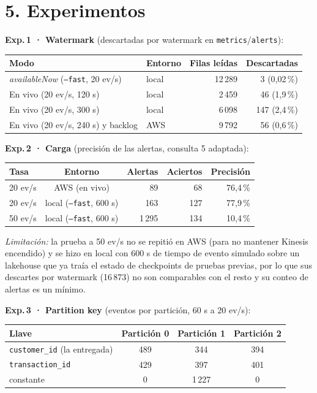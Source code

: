 \documentclass[10pt,a4paper]{article}
\newcommand{\code}[1]{\texttt{\small #1}}
\begin{document}
\section*{5. Experimentos}
\textbf{Exp.\,1 · Watermark} (descartadas por watermark en \code{metrics}/\code{alerts}):
\begin{center}\small\begin{tabular}{@{}llrr@{}}\toprule
\textbf{Modo} & \textbf{Entorno} & \textbf{Filas leídas} & \textbf{Descartadas}\\\midrule
\emph{availableNow} (\code{--fast}, 20 ev/s) & local & 12\,289 & 3 (0,02\,\%)\\
En vivo (20 ev/s, 120 s) & local & 2\,459 & 46 (1,9\,\%)\\
En vivo (20 ev/s, 300 s) & local & 6\,098 & 147 (2,4\,\%)\\
En vivo (20 ev/s, 240 s) y backlog & AWS & 9\,792 & 56 (0,6\,\%)\\\bottomrule
\end{tabular}\end{center}
\textbf{Exp.\,2 · Carga} (precisión de las alertas, consulta 5 adaptada):
\begin{center}\small\begin{tabular}{@{}lcrrr@{}}\toprule
\textbf{Tasa} & \textbf{Entorno} & \textbf{Alertas} & \textbf{Aciertos} & \textbf{Precisión}\\\midrule
20 ev/s & AWS (en vivo) & 89 & 68 & 76,4\,\%\\
20 ev/s & local (\code{--fast}, 600 s) & 163 & 127 & 77,9\,\%\\
50 ev/s & local (\code{--fast}, 600 s) & 1\,295 & 134 & 10,4\,\%\\\bottomrule
\end{tabular}\end{center}
\emph{Limitación:} la prueba a 50 ev/s no se repitió en AWS (para no mantener Kinesis encendido) y se hizo en local con 600 s de tiempo de evento simulado sobre un lakehouse que ya traía el estado de checkpoints de pruebas previas, por lo que sus descartes por watermark (16\,873) no son comparables con el resto y su conteo de alertas es un mínimo.

\textbf{Exp.\,3 · Partition key} (eventos por partición, 60 s a 20 ev/s):
\begin{center}\small\begin{tabular}{@{}lccc@{}}\toprule
\textbf{Llave} & \textbf{Partición 0} & \textbf{Partición 1} & \textbf{Partición 2}\\\midrule
\code{customer\_id} (la entregada) & 489 & 344 & 394\\
\code{transaction\_id} & 429 & 397 & 401\\
constante & 0 & 1\,227 & 0\\\bottomrule
\end{tabular}\end{center}
\end{document}
